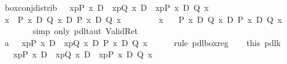 \begin{isabellebody}
\isanewline
\isamarkupfalse%
\ box{\isacharunderscore}conj{\isacharunderscore}distrib{}{\isacharcolon}\ {\isachardoublequote}{\isasymturnstile}\ {\isacharbrackleft}{\isacharhash}\ x{\isasymleftarrow}p{\isacharbrackright}{\isacharparenleft}P\ x{\isacharparenright}\ {\isasymand}\isactrlsub D\ {\isacharbrackleft}{\isacharhash}\ x{\isasymleftarrow}p{\isacharbrackright}{\isacharparenleft}Q\ x{\isacharparenright}\ {\isasymlongrightarrow}\isactrlsub D\ {\isacharbrackleft}{\isacharhash}\ x{\isasymleftarrow}p{\isacharbrackright}{\isacharparenleft}P\ x\ {\isasymand}\isactrlsub D\ Q\ x{\isacharparenright}{\isachardoublequote}\isanewline
\isamarkupfalse%
\ {\isacharminus}\isanewline
\ \ \isamarkupfalse%
\ {\isachardoublequote}{\isasymforall}x{\isachardot}\ {\isasymturnstile}\ P\ x\ {\isasymlongrightarrow}\isactrlsub D\ Q\ x\ {\isasymlongrightarrow}\isactrlsub D\ P\ x\ {\isasymand}\isactrlsub D\ Q\ x{\isachardoublequote}\isanewline
\ \ \isamarkupfalse%
\isanewline
\ \ \ \ \isamarkupfalse%
\ x\ \isamarkupfalse%
\ {\isachardoublequote}{\isasymturnstile}\ P\ x\ {\isasymlongrightarrow}\isactrlsub D\ Q\ x\ {\isasymlongrightarrow}\isactrlsub D\ P\ x\ {\isasymand}\isactrlsub D\ Q\ x{\isachardoublequote}\isanewline
\ \ \ \ \ \ \isamarkupfalse%
\ {\isacharparenleft}simp\ only{\isacharcolon}\ pdl{\isacharunderscore}taut\ Valid{\isacharunderscore}Ret{\isacharparenright}\isanewline
\ \ \isamarkupfalse%
\isanewline
\ \ \isamarkupfalse%
\ a{}{\isacharcolon}\ {\isachardoublequote}{\isasymturnstile}\ {\isacharbrackleft}{\isacharhash}\ x{\isasymleftarrow}p{\isacharbrackright}{\isacharparenleft}P\ x{\isacharparenright}\ {\isasymlongrightarrow}\isactrlsub D\ {\isacharbrackleft}{\isacharhash}\ x{\isasymleftarrow}p{\isacharbrackright}{\isacharparenleft}Q\ x\ {\isasymlongrightarrow}\isactrlsub D\ {\isacharparenleft}P\ x\ {\isasymand}\isactrlsub D\ Q\ x{\isacharparenright}{\isacharparenright}{\isachardoublequote}\isanewline
\ \ \ \ \isamarkupfalse%
\ {\isacharparenleft}rule\ pdl{\isacharunderscore}box{\isacharunderscore}reg{\isacharparenright}\isanewline
\ \ \isamarkupfalse%
\ this\ pdl{\isacharunderscore}k{}\ \isamarkupfalse%
\ {\isachardoublequote}{\isasymturnstile}\ {\isacharbrackleft}{\isacharhash}\ x{\isasymleftarrow}p{\isacharbrackright}{\isacharparenleft}P\ x{\isacharparenright}\ {\isasymlongrightarrow}\isactrlsub D\ {\isacharbrackleft}{\isacharhash}\ x{\isasymleftarrow}p{\isacharbrackright}{\isacharparenleft}Q\ x{\isacharparenright}\ {\isasymlongrightarrow}\isactrlsub D\ {\isacharbrackleft}{\isacharhash}\ x{\isasymleftarrow}p{\isacharbrackright}{\isacharparenleft}P\ x\ {\isasymand}\isactrlsub D\ Q\ x{\isacharparenright}{\isachardoublequote}\isanewline

\end{isabellebody}
